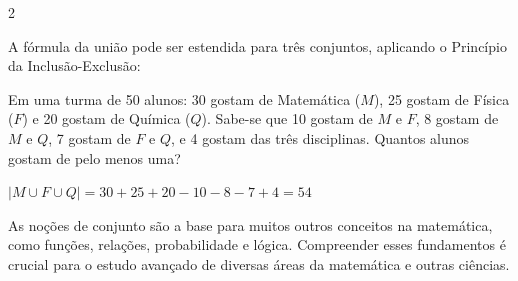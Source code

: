 \documentclass[12pt]{article}
\begin{document}
\begin{multicols}{2}
\begin{center}
\end{center}




A fórmula da união pode ser estendida para três conjuntos, aplicando o Princípio da Inclusão-Exclusão:



Em uma turma de 50 alunos: 30 gostam de Matemática ($M$), 25 gostam de Física ($F$) e 20 gostam de Química ($Q$). Sabe-se que 10 gostam de $M$ e $F$, 8 gostam de $M$ e $Q$, 7 gostam de $F$ e $Q$, e 4 gostam das três disciplinas. Quantos alunos gostam de pelo menos uma?

$|M \cup F \cup Q| = 30 + 25 + 20 - 10 - 8 - 7 + 4 = 54$

As noções de conjunto são a base para muitos outros conceitos na matemática, como funções, relações, probabilidade e lógica. Compreender esses fundamentos é crucial para o estudo avançado de diversas áreas da matemática e outras ciências.

\end{multicols}

\end{document}
